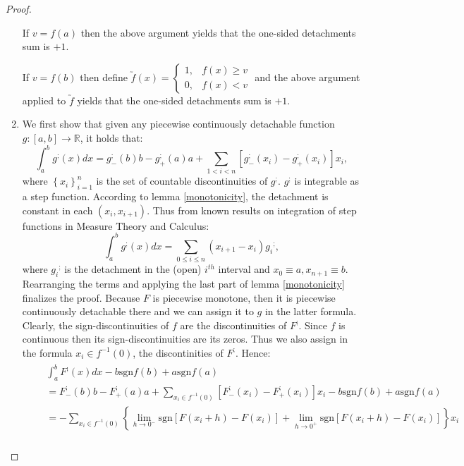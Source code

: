 \documentclass[11pt]{book}
\begin{document}
\begin{proof}
\begin{enumerate}
If $v=f\left(a\right)$ then the above argument yields that the one-sided detachments sum is $+1$.

If $v=f\left(b\right)$ then define $\utilde{f}\left(x\right)=\begin{cases}
1, & f\left(x\right)\geq v\\
0, & f\left(x\right)<v
\end{cases}$ and the above argument applied to $\utilde{f}$ yields that the one-sided detachments sum is $+1$.
\item We first show that given any piecewise continuously detachable function $g:\left[a,b\right]\rightarrow\mathbb{R}$, it holds that: $$\int_{a}^{b}g^{;}(x)dx=g_{-}^{;}\left(b\right)b-g_{+}^{;}\left(a\right)a+\underset{1<i<n}{\sum}\left[g_{-}^{;}\left(x_{i}\right)-g_{+}^{;}\left(x_{i}\right)\right]x_{i},$$ where $\left\{ x_{i}\right\} _{i=1}^{n}$ is the set of countable discontinuities of $g^{;}$. $g^{;}$ is integrable as a step function. According to lemma \ref{monotonicity}, the detachment is constant in each $\left(x_{i},x_{i+1}\right)$. Thus from known results on integration of step functions in Measure Theory and Calculus:$$\int_{a}^{b}g^{;}\left(x\right)dx=\underset{0\leq i\leq n}{\sum}\left(x_{i+1}-x_{i}\right)g_{i}{}^{;},$$
where $g_{i}{}^{;}$ is the detachment in the (open) $i^{th}$ interval and $x_{0}\equiv a,x_{n+1}\equiv b$. Rearranging the terms and applying the last part of lemma \ref{monotonicity} finalizes the proof. Because $F$ is piecewise monotone, then it is piecewise continuously detachable there and we can assign it to $g$ in the latter formula. Clearly, the sign-discontinuities of $f$ are the discontinuities of $F^{;}$. Since $f$ is continuous then its sign-discontinuities are its zeros. Thus we also assign in the formula $x_{i}\in f^{-1}\left(0\right)$, the discontinities of $F^{;}$. Hence:
\begin{align}
&\begin{aligned}
&\int_{a}^{b}F^{;}\left(x\right)dx-b\text{sgn}f\left(b\right)+a\text{sgn}f\left(a\right)\\
&=F_{-}^{;}\left(b\right)b-F_{+}^{;}\left(a\right)a+\underset{x_{i}\in f^{-1}\left(0\right)}{\sum}\left[F_{-}^{;}\left(x_{i}\right)-F_{+}^{;}\left(x_{i}\right)\right]x_{i}
-b\text{sgn}f\left(b\right)+a\text{sgn}f\left(a\right) \\
&=-\underset{x_{i}\in f^{-1}\left(0\right)}{\sum}\left\{ \underset{h\rightarrow0^{-}}{\lim}\text{sgn}\left[F\left(x_{i}+h\right)-F\left(x_{i}\right)\right]+\underset{h\rightarrow0^{+}}{\lim}\text{sgn}\left[F\left(x_{i}+h\right)-F\left(x_{i}\right)\right]\right\} x_{i}\\

\end{aligned}
\end{align}
\end{enumerate}
\end{proof}
\end{document}

